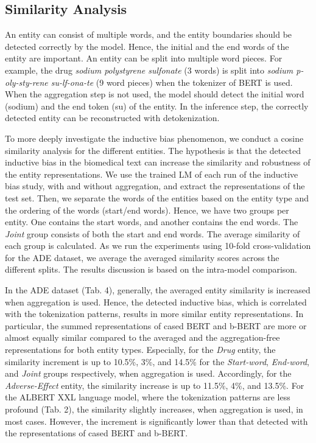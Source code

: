 \documentclass[runningheads]{llncs}
\begin{document}
\subsection{Similarity Analysis}
\vspace{-2.5mm}
An entity can consist of multiple words, and the entity boundaries should be detected correctly by the model. Hence, the initial and the end words of the entity are important. An entity can be split into multiple word pieces. For example, the drug \textit{sodium polystyrene sulfonate} (3 words) is split into \textit{sodium p-oly-sty-rene su-lf-ona-te} (9 word pieces) when the tokenizer of BERT is used. When the aggregation step is not used, the model should detect the initial word (sodium) and the end token (su) of the entity. In the inference step, the correctly detected entity can be reconstructed with detokenization.

To more deeply investigate the inductive bias phenomenon, we conduct a cosine similarity analysis for the different entities. The hypothesis is that the detected inductive bias in the biomedical text can increase the similarity and robustness of the entity representations. We use the trained LM of each run of the inductive bias study, with and without aggregation, and extract the representations of the test set. Then, we separate the words of the entities based on the entity type and the ordering of the words (start/end words). Hence, we have two groups per entity. One contains the start words, and another contains the end words. The \textit{Joint} group consists of both the start and end words. The average similarity of each group is calculated. As we run the experiments using 10-fold cross-validation for the ADE dataset, we average the averaged similarity scores across the different splits. The results discussion is based on the intra-model comparison.

In the ADE dataset (Tab. 4), generally, the averaged entity similarity is increased when aggregation is used. Hence, the detected inductive bias, which is correlated with the tokenization patterns, results in more similar entity representations. In particular, the summed representations of cased BERT and b-BERT are more or almost equally similar compared to the averaged and the aggregation-free representations for both entity types. Especially, for the \textit{Drug} entity, the similarity increment is up to 10.5\%, 3\%, and 14.5\% for the \textit{Start-word}, \textit{End-word}, and \textit{Joint} groups respectively, when aggregation  is used. Accordingly, for the \textit{Adverse-Effect} entity, the similarity increase is up to 11.5\%, 4\%, and 13.5\%. For the ALBERT XXL language model, where the tokenization patterns are less profound (Tab. 2), the similarity slightly increases, when aggregation is used, in most cases. However, the increment is significantly lower than that detected with the representations of cased BERT and b-BERT.
\end{document}
